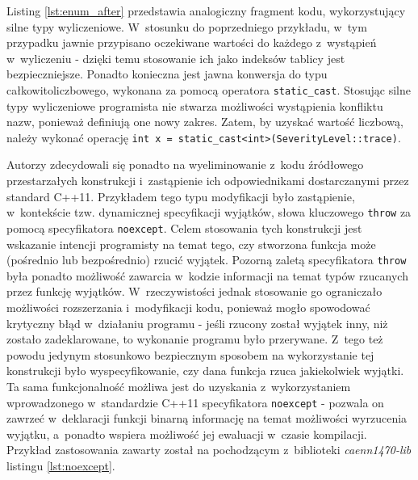 

Listing \ref{lst:enum_after} przedstawia analogiczny fragment kodu, wykorzystujący silne typy wyliczeniowe. W~stosunku do poprzedniego przykładu, w~tym przypadku jawnie przypisano oczekiwane wartości do każdego z~wystąpień w~wyliczeniu - dzięki temu stosowanie ich jako indeksów tablicy jest bezpieczniejsze. Ponadto konieczna jest jawna konwersja do typu całkowitoliczbowego, wykonana za pomocą operatora \lstinline{static_cast}. Stosując silne typy wyliczeniowe programista nie stwarza możliwości wystąpienia konfliktu nazw, ponieważ definiują one nowy zakres. Zatem, by uzyskać wartość liczbową, należy wykonać operację \lstinline{int x = static_cast<int>(SeverityLevel::trace)}.



Autorzy zdecydowali się ponadto na wyeliminowanie z~kodu źródłowego przestarzałych konstrukcji i~zastąpienie ich odpowiednikami dostarczanymi przez standard C++11. Przykładem tego typu 
modyfikacji było zastąpienie, w~kontekście tzw. dynamicznej specyfikacji wyjątków, słowa kluczowego \lstinline{throw} za pomocą specyfikatora \lstinline{noexcept}. Celem stosowania tych konstrukcji jest wskazanie intencji programisty na temat tego, czy stworzona funkcja może (pośrednio lub bezpośrednio) rzucić wyjątek. Pozorną zaletą specyfikatora \lstinline{throw} była ponadto możliwość zawarcia w~kodzie informacji na temat typów rzucanych przez funkcję wyjątków. W~rzeczywistości jednak stosowanie go ograniczało możliwości rozszerzania i~modyfikacji kodu, ponieważ mogło spowodować krytyczny błąd w~działaniu programu - jeśli rzucony został wyjątek inny, niż zostało zadeklarowane, to wykonanie programu było przerywane. Z~tego też powodu jedynym stosunkowo bezpiecznym sposobem na wykorzystanie tej konstrukcji było wyspecyfikowanie, czy dana funkcja rzuca jakiekolwiek wyjątki. Ta sama funkcjonalność możliwa jest do uzyskania z~wykorzystaniem wprowadzonego w~standardzie C++11 specyfikatora \lstinline{noexcept} - pozwala on zawrzeć w~deklaracji funkcji binarną informację na temat możliwości wyrzucenia wyjątku, a~ponadto wspiera możliwość jej ewaluacji w~czasie kompilacji. Przykład zastosowania zawarty został na pochodzącym z~biblioteki \emph{caenn1470-lib} listingu \ref{lst:noexcept}. 

